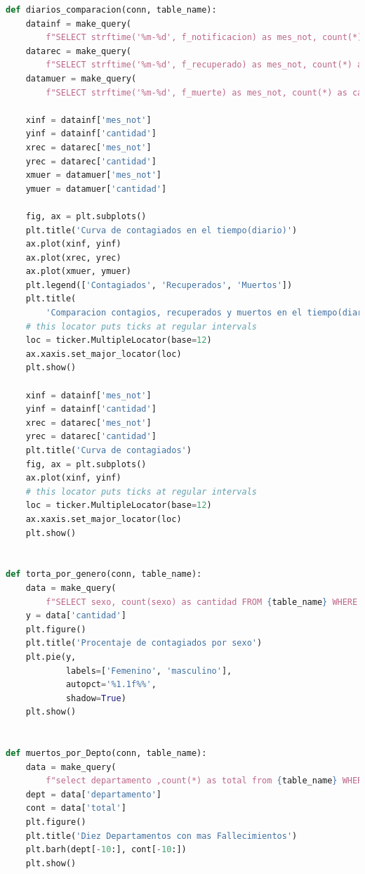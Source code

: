 \documentclass[conference,compsoc,onecolumn]{IEEEtran}
\begin{document}
\begin{itemize}
\begin{lstlisting}[language=python, caption=Funciones que muestran las estadísticas del Covid-19, captionpos=b, label=lst:SNRCode]
def diarios_comparacion(conn, table_name):
    datainf = make_query(
        f"SELECT strftime('%m-%d', f_notificacion) as mes_not, count(*) as cantidad FROM {table_name} GROUP BY mes_not ORDER BY mes_not", conn)
    datarec = make_query(
        f"SELECT strftime('%m-%d', f_recuperado) as mes_not, count(*) as cantidad FROM {table_name} WHERE mes_not IS NOT NULL GROUP BY mes_not ORDER BY mes_not", conn)
    datamuer = make_query(
        f"SELECT strftime('%m-%d', f_muerte) as mes_not, count(*) as cantidad FROM {table_name} WHERE mes_not IS NOT NULL GROUP BY mes_not ORDER BY mes_not", conn)

    xinf = datainf['mes_not']
    yinf = datainf['cantidad']
    xrec = datarec['mes_not']
    yrec = datarec['cantidad']
    xmuer = datamuer['mes_not']
    ymuer = datamuer['cantidad']

    fig, ax = plt.subplots()
    plt.title('Curva de contagiados en el tiempo(diario)')
    ax.plot(xinf, yinf)
    ax.plot(xrec, yrec)
    ax.plot(xmuer, ymuer)
    plt.legend(['Contagiados', 'Recuperados', 'Muertos'])
    plt.title(
        'Comparacion contagios, recuperados y muertos en el tiempo(diarios')
    # this locator puts ticks at regular intervals
    loc = ticker.MultipleLocator(base=12)
    ax.xaxis.set_major_locator(loc)
    plt.show()

    xinf = datainf['mes_not']
    yinf = datainf['cantidad']
    xrec = datarec['mes_not']
    yrec = datarec['cantidad']
    plt.title('Curva de contagiados')
    fig, ax = plt.subplots()
    ax.plot(xinf, yinf)
    # this locator puts ticks at regular intervals
    loc = ticker.MultipleLocator(base=12)
    ax.xaxis.set_major_locator(loc)
    plt.show()


def torta_por_genero(conn, table_name):
    data = make_query(
        f"SELECT sexo, count(sexo) as cantidad FROM {table_name} WHERE sexo = 'F'  OR sexo = 'M' GROUP BY sexo", conn)
    y = data['cantidad']
    plt.figure()
    plt.title('Procentaje de contagiados por sexo')
    plt.pie(y,
            labels=['Femenino', 'masculino'],
            autopct='%1.1f%%',
            shadow=True)
    plt.show()


def muertos_por_Depto(conn, table_name):
    data = make_query(
        f"select departamento ,count(*) as total from {table_name} WHERE atencion='Fallecido' GROUP BY departamento ORDER BY total", conn)
    dept = data['departamento']
    cont = data['total']
    plt.figure()
    plt.title('Diez Departamentos con mas Fallecimientos')
    plt.barh(dept[-10:], cont[-10:])
    plt.show()



\end{lstlisting}
\end{itemize}
\end{document}
